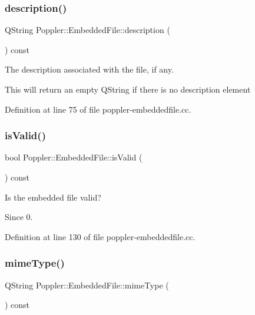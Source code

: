 \subsubsection{\texorpdfstring{description()}{description()}}
{\footnotesize\ttfamily Q\+String Poppler\+::\+Embedded\+File\+::description (\begin{DoxyParamCaption}{ }\end{DoxyParamCaption}) const}

The description associated with the file, if any.

This will return an empty Q\+String if there is no description element 

Definition at line 75 of file poppler-\/embeddedfile.\+cc.

\mbox{\label{class_poppler_1_1_embedded_file_a1b35b34decb76a1553109dd66bc368ee}} 
\subsubsection{\texorpdfstring{is\+Valid()}{isValid()}}
{\footnotesize\ttfamily bool Poppler\+::\+Embedded\+File\+::is\+Valid (\begin{DoxyParamCaption}{ }\end{DoxyParamCaption}) const}

Is the embedded file valid?

\begin{DoxySince}{Since}
0. 
\end{DoxySince}


Definition at line 130 of file poppler-\/embeddedfile.\+cc.

\mbox{\label{class_poppler_1_1_embedded_file_a9e52a79a453da96dbccb47cdbd401c6f}} 
\subsubsection{\texorpdfstring{mime\+Type()}{mimeType()}}
{\footnotesize\ttfamily Q\+String Poppler\+::\+Embedded\+File\+::mime\+Type (\begin{DoxyParamCaption}{ }\end{DoxyParamCaption}) const}

